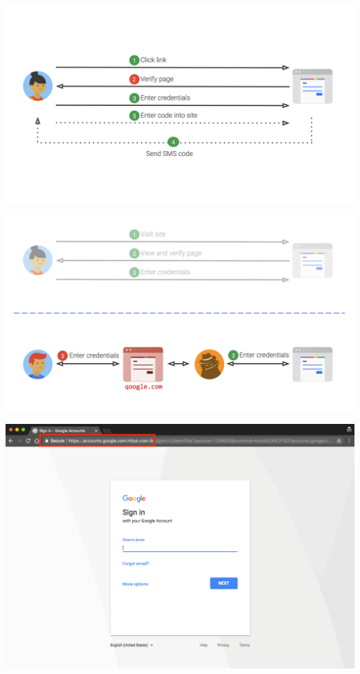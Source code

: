 \documentclass[nobackground,dvipsnames,table,aspectratio=169]{beamer}
\begin{document}
\begin{frame}{}%
    \thispagestyle{empty}
    \includegraphics[width=\paperwidth]{login-diagram}
\end{frame}

\begin{frame}{}%
    \thispagestyle{empty}
    \includegraphics[width=\paperwidth]{login-diagram-phishing}
\end{frame}

\begin{frame}{}%
    \thispagestyle{empty}
    \includegraphics[width=\paperwidth]{bad-link-browser}
\end{frame}
\end{document}
